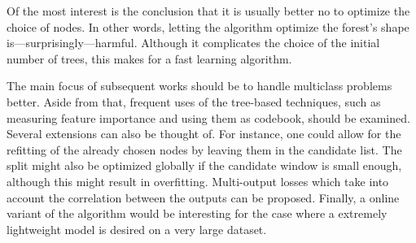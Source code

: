 \documentclass{article}
\begin{document}
Of the most interest is the conclusion that it is usually better no to optimize 
the choice of nodes. In other words, letting the algorithm optimize the 
forest's shape is---surprisingly---harmful. Although it complicates the choice 
of the initial number of trees, this makes for a fast learning algorithm.

The main focus of subsequent works should be to handle multiclass problems 
better. Aside from that, frequent uses of the tree-based techniques, such as 
measuring feature importance and using them as codebook, should be examined. 
Several extensions can also be thought of. For instance, one could allow for 
the refitting of the already chosen nodes by leaving them in the candidate 
list. The split might also be optimized globally if the candidate window is 
small enough, although this might result in overfitting. Multi-output losses 
which take into account the correlation between the outputs can be proposed. 
Finally, a online variant of the algorithm would be interesting for the case 
where a extremely lightweight model is desired on a very large dataset.












\end{document}
